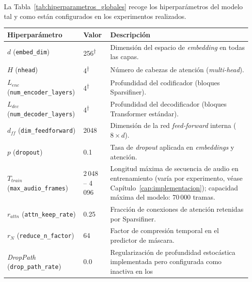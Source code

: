 La Tabla~\ref{tab:hiperparametros_globales} recoge los hiperparámetros
del modelo tal y como están configurados en los experimentos realizados.

\begin{table}[H]
    \centering
    \renewcommand{\arraystretch}{1.3}
    \begin{tabular}{l l p{7cm}}
        \hline
        \textbf{Hiperparámetro} & \textbf{Valor} & \textbf{Descripción} \\
        \hline
        $d$ (\texttt{embed\_dim})
            & 256\textsuperscript{†}
            & Dimensión del espacio de \textit{embedding} en todas
              las capas. \\
        $H$ (\texttt{nhead})
            & 4\textsuperscript{†}
            & Número de cabezas de atención (\textit{multi-head}). \\
        $L_{enc}$ (\texttt{num\_encoder\_layers})
            & 4\textsuperscript{†}
            & Profundidad del codificador (bloques Sparsifiner). \\
        $L_{dec}$ (\texttt{num\_decoder\_layers})
            & 4\textsuperscript{†}
            & Profundidad del decodificador (bloques Transformer
              estándar). \\
        $d_{ff}$ (\texttt{dim\_feedforward})
            & 2048
            & Dimensión de la red \textit{feed-forward} interna
              ($8 \times d$). \\
        $p$ (\texttt{dropout})
            & 0.1
            & Tasa de \textit{dropout} aplicada en
              \textit{embeddings} y atención. \\
        $T_{train}$ (\texttt{max\_audio\_frames})
            & 2\,048 -- 4\,096
            & Longitud máxima de secuencia de audio en
              entrenamiento (varía por experimento, véase
              Capítulo~\ref{cap:implementacion}); capacidad máxima
              del modelo: 70\,000 tramas. \\
        $r_{attn}$ (\texttt{attn\_keep\_rate})
            & 0.25
            & Fracción de conexiones de atención retenidas por
              Sparsifiner. \\
        $r_{N}$ (\texttt{reduce\_n\_factor})
            & 64
            & Factor de compresión temporal en el predictor de
              máscara. \\
        \textit{DropPath} (\texttt{drop\_path\_rate})
            & 0.0
            & Regularización de profundidad estocástica
              implementada pero configurada como inactiva en los

\end{tabular}
\end{table}
